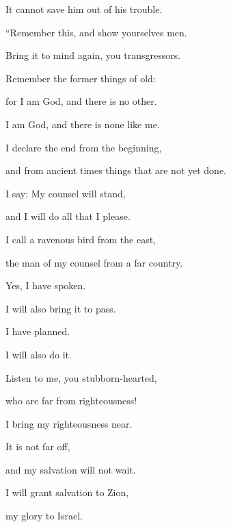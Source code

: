 {\par }{\QB It cannot save him out of his trouble.
\par }{\BB \par }{\Q {}“Remember this, and show yourselves men.
\par }{\QB Bring it to mind again, you transgressors.
\par }{\Q {}Remember the former things of old:
\par }{\QB for I am God, and there is no other.
\par }{\QB I am God, and there is none like me.
\par }{\Q {}I declare the end from the beginning,
\par }{\QB and from ancient times things that are not yet done.
\par }{\Q I say: My counsel will stand,
\par }{\QB and I will do all that I please.
\par }{\Q {}I call a ravenous bird from the east,
\par }{\QB the man of my counsel from a far country.
\par }{\Q Yes, I have spoken.
\par }{\QB I will also bring it to pass.
\par }{\Q I have planned.
\par }{\QB I will also do it.
\par }{\BB \par }{\Q {}Listen to me, you stubborn-hearted,
\par }{\QB who are far from righteousness!
\par }{\Q {}I bring my righteousness near.
\par }{\QB It is not far off,
\par }{\QB and my salvation will not wait.
\par }{\Q I will grant salvation to Zion,
\par }{\QB my glory to Israel.
\par }{\BB \par }

